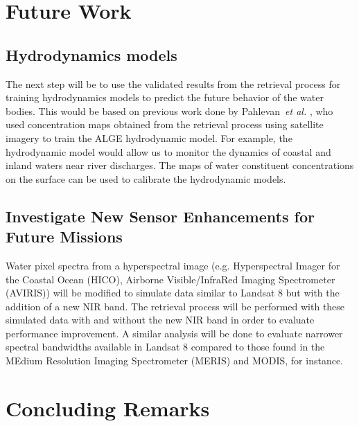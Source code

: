 \section{Future Work}
\subsection{Hydrodynamics models} 
The next step will be to use the validated results from the retrieval process for training hydrodynamics models to predict the future behavior of the water bodies. This would be based on previous work done by Pahlevan~{\it et al.} \cite{Pahlevan:2012b}, who used concentration maps obtained from the retrieval process using satellite imagery to train the ALGE hydrodynamic model. For example, the hydrodynamic model would allow us to monitor the dynamics of coastal and inland waters near river discharges. The maps of water constituent concentrations on the surface can be used to calibrate the hydrodynamic models.

\subsection{Investigate New Sensor Enhancements for Future Missions}
Water pixel spectra from a hyperspectral image (e.g. Hyperspectral Imager for the Coastal Ocean (HICO),  Airborne Visible/InfraRed Imaging Spectrometer (AVIRIS)) will be modified to simulate data similar to Landsat 8 but with the addition of a new NIR band. The retrieval process will be performed with these simulated data with and without the new NIR band in order to evaluate performance improvement. A similar analysis will be done to evaluate narrower spectral bandwidths available in Landsat 8 compared to those found in the MEdium Resolution Imaging Spectrometer (MERIS) and MODIS, for instance. 

\section{Concluding Remarks}